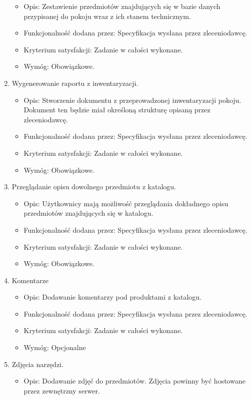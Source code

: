 \documentclass{article}
\begin{document}
\begin{enumerate}
\begin{itemize}
\item Opis: Zestawienie przedmiotów znajdujących się w bazie danych przypisanej do pokoju wraz z ich stanem technicznym.
\item Funkcjonalność dodana przez: Specyfikacja wysłana przez zleceniodawcę.
\item Kryterium satysfakcji: Zadanie w całości wykonane.
\item Wymóg: Obowiązkowe.
\end{itemize}
\item Wygenerowanie raportu z inwentaryzacji.
\begin{itemize}
\item Opis: Stworzenie dokumentu z przeprowadzonej inwentaryzacji pokoju. Dokument ten będzie miał określoną strukturę opisaną przez zleceniodawcę.
\item Funkcjonalność dodana przez: Specyfikacja wysłana przez zleceniodawcę.
\item Kryterium satysfakcji: Zadanie w całości wykonane.
\item Wymóg: Obowiązkowe.
\end{itemize}
\item Przeglądanie opisu dowolnego przedmiotu z katalogu.
\begin{itemize}
\item Opis: Użytkownicy mają możliwość przeglądania dokładnego opisu przedmiotów znajdujących się w katalogu.
\item Funkcjonalność dodana przez: Specyfikacja wysłana przez zleceniodawcę.
\item Kryterium satysfakcji: Zadanie w całości wykonane.
\item Wymóg: Obowiązkowe.
\end{itemize}
\item Komentarze
\begin{itemize}
\item Opis: Dodawanie komentarzy pod produktami z katalogu.
\item Funkcjonalność dodana przez: Specyfikacja wysłana przez zleceniodawcę.
\item Kryterium satysfakcji: Zadanie w całości wykonane.
\item Wymóg: Opcjonalne
\end{itemize}
\item Zdjęcia narzędzi.
\begin{itemize}
\item Opis: Dodawanie zdjęć do przedmiotów. Zdjęcia powinny być hostowane przez zewnętrzny serwer.

\end{itemize}
\end{enumerate}
\end{document}
